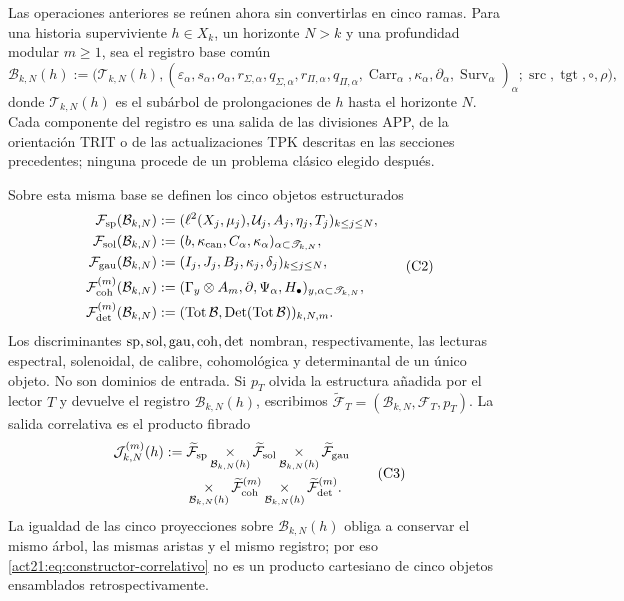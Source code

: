 Las operaciones anteriores se reúnen ahora sin convertirlas en cinco ramas.
Para una historia superviviente \(h\in X_k\), un horizonte \(N>k\) y una
profundidad modular \(m\geq1\), sea el registro base común
\[
 \mathcal B_{k,N}(h):=
 \bigl(\mathscr T_{k,N}(h),
       (\varepsilon_\alpha,s_\alpha,o_\alpha,
        r_{\Sigma,\alpha},q_{\Sigma,\alpha},
        r_{\Pi,\alpha},q_{\Pi,\alpha},
        \operatorname{Carr}_\alpha,
        \kappa_\alpha,\partial_\alpha,
        \operatorname{Surv}_\alpha)_\alpha;
       \operatorname{src},\operatorname{tgt},\circ,\rho\bigr),
 \tag{C1}
 \label{act21:eq:base-comun-registros}
\]
donde \(\mathscr T_{k,N}(h)\) es el subárbol de prolongaciones de \(h\)
hasta el horizonte \(N\). Cada componente del registro es una salida de las
divisiones APP, de la orientación TRIT o de las actualizaciones TPK descritas
en las secciones precedentes; ninguna procede de un problema clásico elegido
después.

Sobre esta misma base se definen los cinco objetos estructurados
\[
\begin{aligned}
 \mathcal F_{\rm sp}(\mathcal B_{k,N})
   &:=(\ell^2(X_j,\mu_j),\mathcal U_j,A_j,\eta_j,T_j)_{k\leq j\leq N},\\
 \mathcal F_{\rm sol}(\mathcal B_{k,N})
   &:=(b,\kappa_{\rm can},C_\alpha,\kappa_\alpha)_{\alpha\subset\mathscr T_{k,N}},\\
 \mathcal F_{\rm gau}(\mathcal B_{k,N})
   &:=(I_j,J_j,B_j,\kappa_j,\delta_j)_{k\leq j\leq N},\\
 \mathcal F_{\rm coh}^{(m)}(\mathcal B_{k,N})
   &:=(\Gamma_y\otimes A_m,\partial,\Psi_\alpha,H_\bullet)_{y,\alpha\subset\mathscr T_{k,N}},\\
 \mathcal F_{\rm det}^{(m)}(\mathcal B_{k,N})
   &:=(\operatorname{Tot}\mathcal B,\operatorname{Det}(\operatorname{Tot}\mathcal B))_{k,N,m}.
\end{aligned}
 \tag{C2}
\]
Los discriminantes \({\rm sp},{\rm sol},{\rm gau},{\rm coh},{\rm det}\)
nombran, respectivamente, las lecturas espectral, solenoidal, de calibre,
cohomológica y determinantal de un único objeto. No son dominios de entrada.
Si \(p_T\) olvida la estructura añadida por el lector \(T\) y devuelve el
registro \(\mathcal B_{k,N}(h)\), escribimos
\(\widetilde{\mathcal F}_T=(\mathcal B_{k,N},\mathcal F_T,p_T)\). La salida
correlativa es el producto fibrado
\[
\begin{aligned}
 \mathcal J_{k,N}^{(m)}(h):={}&
 \widetilde{\mathcal F}_{\rm sp}
 \mathop{\times}_{\mathcal B_{k,N}(h)}
 \widetilde{\mathcal F}_{\rm sol}
 \mathop{\times}_{\mathcal B_{k,N}(h)}
 \widetilde{\mathcal F}_{\rm gau}\\
 &\mathop{\times}_{\mathcal B_{k,N}(h)}
 \widetilde{\mathcal F}_{\rm coh}^{(m)}
 \mathop{\times}_{\mathcal B_{k,N}(h)}
 \widetilde{\mathcal F}_{\rm det}^{(m)}.
\end{aligned}
 \tag{C3}
 \label{act21:eq:constructor-correlativo}
\]
La igualdad de las cinco proyecciones sobre \(\mathcal B_{k,N}(h)\) obliga a
conservar el mismo árbol, las mismas aristas y el mismo registro; por eso
\eqref{act21:eq:constructor-correlativo} no es un producto cartesiano de cinco
objetos ensamblados retrospectivamente.

